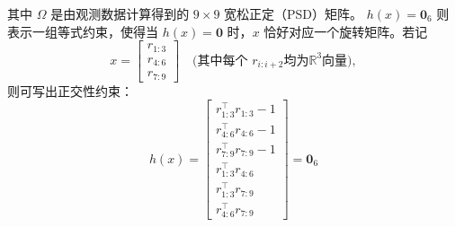 其中 $\Omega$ 是由观测数据计算得到的 $9 \times 9$ 宽松正定（PSD）矩阵。  
$h(x) = \mathbf{0}_6$ 则表示一组等式约束，使得当 $h(x)=\mathbf{0}$ 时，$x$ 恰好对应一个旋转矩阵。若记
\[
x = 
\begin{bmatrix}
	r_{1:3} \\[2pt]
	r_{4:6} \\[2pt]
	r_{7:9}
\end{bmatrix}
\quad\text{(其中每个 }r_{i:i+2}\text{均为}\mathbb{R}^3\text{向量)},
\]
则可写出正交性约束：
\begin{equation}
	h(x)  = 
	\begin{bmatrix}
		r_{1:3}^\top r_{1:3}  -  1 \\
		r_{4:6}^\top r_{4:6}  -  1 \\
		r_{7:9}^\top r_{7:9}  -  1 \\
		r_{1:3}^\top r_{4:6} \\
		r_{1:3}^\top r_{7:9} \\
		r_{4:6}^\top r_{7:9}
	\end{bmatrix}
	 = 
	\mathbf{0}_6 
\end{equation}
